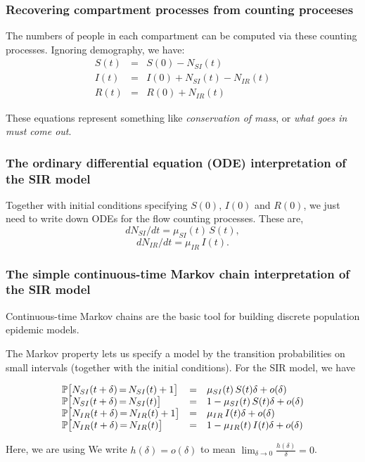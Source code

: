\documentclass{beamer}\usepackage[]{graphicx}\usepackage[]{color}
\begin{document}
\begin{frame}[fragile]

\frametitle{Recovering compartment processes from counting proceeses}

\bi

\item The numbers of people in each compartment can be computed via these counting processes. Ignoring demography, we have:
$$\begin{array}{lcl} 
S(t)&=& S(0) - N_{SI}(t)
\\
I(t)&=& I(0) + N_{SI}(t) - N_{IR}(t)
\\
R(t) &=& R(0) + N_{IR}(t)
\end{array}$$

\item These equations represent something like {\it conservation of mass}, or {\it what goes in must come out}. 


\ei

\end{frame}

\begin{frame}[fragile]


\frametitle{The ordinary differential equation (ODE) interpretation of the SIR model}

Together with initial conditions specifying $S(0)$, $I(0)$ and $R(0)$, we just need to write down ODEs for the flow counting processes. These are,
$$ dN_{SI}/dt = \mu_{SI}(t) \, S(t),$$
$$ dN_{IR}/dt = \mu_{IR}\, I(t).$$


\end{frame}

\begin{frame}[fragile]

\frametitle{The simple continuous-time Markov chain interpretation of the SIR model}

\bi

\item Continuous-time Markov chains are the basic tool for building discrete population epidemic models.

\item The Markov property lets us specify a model by the transition probabilities on small intervals (together with the initial conditions). For the SIR model, we have

$$\begin{array}{lcl}
\mathbb{P}\big[N_{SI}(t+\delta){ \, = \, } N_{SI}(t)+1\big] &=& \mu_{SI}(t) \, S(t) \delta + o(\delta)
\\
\mathbb{P}\big[N_{SI}(t+\delta){ \, = \, } N_{SI}(t)\big] &=& 1-\mu_{SI}(t) \, S(t) \delta + o(\delta)
\\
\mathbb{P}\big[N_{IR}(t+\delta){ \, = \, } N_{IR}(t)+1\big] &=& \mu_{IR} \, I(t) \delta + o(\delta)
\\
\mathbb{P}\big[N_{IR}(t+\delta){ \, = \, } N_{IR}(t)\big] &=& 1-\mu_{IR}(t) \, I(t) \delta + o(\delta)
\end{array}$$

\item Here, we are using 
We write 
$ h(\delta)=o(\delta)$
to mean 
$ \lim_{\delta\to 0} \frac{h(\delta)}{\delta} = 0$.
\ei
\end{frame}
\end{document}
